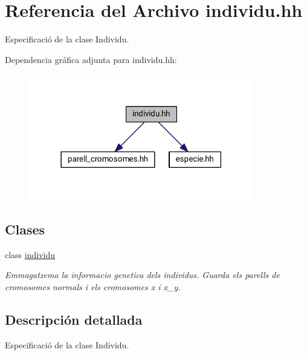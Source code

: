 \hypertarget{individu_8hh}{}\section{Referencia del Archivo individu.\+hh}
\label{individu_8hh}


Especificació de la clase Individu.  


Dependencia gráfica adjunta para individu.\+hh\+:\nopagebreak
\begin{figure}[H]
\begin{center}
\leavevmode
\includegraphics[width=278pt]{individu_8hh__incl}
\end{center}
\end{figure}
\subsection*{Clases}
\begin{DoxyCompactItemize}
\item 
class \hyperlink{classindividu}{individu}
\begin{DoxyCompactList}\small\item\em Emmagatzema la informacio genetica dels individus. Guarda els parells de cromosomes normals i els cromosomes x i x\+\_\+y. \end{DoxyCompactList}\end{DoxyCompactItemize}


\subsection{Descripción detallada}
Especificació de la clase Individu. 

